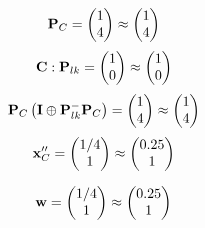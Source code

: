 \documentclass[10pt,a4paper]{article}
\begin{document}
	\[
		\bold{P}_{C} = 
		\begin{pmatrix}
			{1}{} \\
			{{4}}{} \\
		\end{pmatrix}
		\approx
		\begin{pmatrix}
			1        \\
			4        \\
		\end{pmatrix}
	\]
	\[
		\bold{C}: \bold{P}_{lk} = 
		\begin{pmatrix}
			{1}{} \\
			{{0}}{} \\
		\end{pmatrix}
		\approx
		\begin{pmatrix}
			1        \\
			0        \\
		\end{pmatrix}
	\]
	\[
		\bold{P}_{C}\left(\bold{I} \oplus \bold{P}_{lk}^{-}\bold{P}_{C}\right) = 
		\begin{pmatrix}
			{1}{} \\
			{{4}}{} \\
		\end{pmatrix}
		\approx
		\begin{pmatrix}
			1        \\
			4        \\
		\end{pmatrix}
	\]
	\[
		\bold{x}''_{C} = 
		\begin{pmatrix}
			{1} / {{4}} \\
			{1}{} \\
		\end{pmatrix}
		\approx
		\begin{pmatrix}
			0.25     \\
			1        \\
		\end{pmatrix}
	\]

	\[
		\bold{w} = 
		\begin{pmatrix}
			{1} / {{4}} \\
			{1}{} \\
		\end{pmatrix}
		\approx
		\begin{pmatrix}
			0.25     \\
			1        \\
		\end{pmatrix}
	\]
\end{document}
